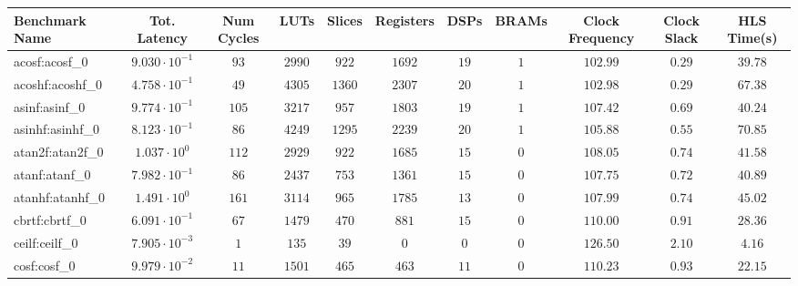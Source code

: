 \begin{tabular}{|l|c|c|c|c|c|c|c|c|c|c|}
\hline
Benchmark Name               & Tot. Latency            & Num Cycles & LUTs      & Slices    & Registers & DSPs    & BRAMs & Clock Frequency & Clock Slack & HLS Time(s) \\
\hline
acosf:acosf\_0               & $ 9.030 \cdot 10^{-1} $ & $ 93     $ & $ 2990  $ & $ 922   $ & $ 1692  $ & $ 19  $ & $ 1 $ & $ 102.99      $ & $ 0.29    $ & $ 39.78   $ \\
acoshf:acoshf\_0             & $ 4.758 \cdot 10^{-1} $ & $ 49     $ & $ 4305  $ & $ 1360  $ & $ 2307  $ & $ 20  $ & $ 1 $ & $ 102.98      $ & $ 0.29    $ & $ 67.38   $ \\
asinf:asinf\_0               & $ 9.774 \cdot 10^{-1} $ & $ 105    $ & $ 3217  $ & $ 957   $ & $ 1803  $ & $ 19  $ & $ 1 $ & $ 107.42      $ & $ 0.69    $ & $ 40.24   $ \\
asinhf:asinhf\_0             & $ 8.123 \cdot 10^{-1} $ & $ 86     $ & $ 4249  $ & $ 1295  $ & $ 2239  $ & $ 20  $ & $ 1 $ & $ 105.88      $ & $ 0.55    $ & $ 70.85   $ \\
atan2f:atan2f\_0             & $ 1.037 \cdot 10^{0}  $ & $ 112    $ & $ 2929  $ & $ 922   $ & $ 1685  $ & $ 15  $ & $ 0 $ & $ 108.05      $ & $ 0.74    $ & $ 41.58   $ \\
atanf:atanf\_0               & $ 7.982 \cdot 10^{-1} $ & $ 86     $ & $ 2437  $ & $ 753   $ & $ 1361  $ & $ 15  $ & $ 0 $ & $ 107.75      $ & $ 0.72    $ & $ 40.89   $ \\
atanhf:atanhf\_0             & $ 1.491 \cdot 10^{0}  $ & $ 161    $ & $ 3114  $ & $ 965   $ & $ 1785  $ & $ 13  $ & $ 0 $ & $ 107.99      $ & $ 0.74    $ & $ 45.02   $ \\
cbrtf:cbrtf\_0               & $ 6.091 \cdot 10^{-1} $ & $ 67     $ & $ 1479  $ & $ 470   $ & $ 881   $ & $ 15  $ & $ 0 $ & $ 110.00      $ & $ 0.91    $ & $ 28.36   $ \\
ceilf:ceilf\_0               & $ 7.905 \cdot 10^{-3} $ & $ 1      $ & $ 135   $ & $ 39    $ & $ 0     $ & $ 0   $ & $ 0 $ & $ 126.50      $ & $ 2.10    $ & $ 4.16    $ \\
cosf:cosf\_0                 & $ 9.979 \cdot 10^{-2} $ & $ 11     $ & $ 1501  $ & $ 465   $ & $ 463   $ & $ 11  $ & $ 0 $ & $ 110.23      $ & $ 0.93    $ & $ 22.15   $ \\

\end{tabular}
